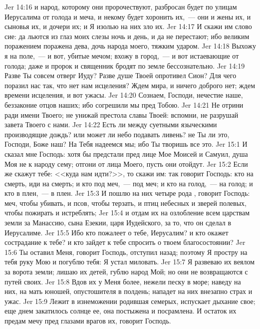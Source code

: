 \vs Jer 14:16 и народ, которому они пророчествуют, разбросан будет по улицам Иерусалима от голода и меча, и некому будет хоронить их,~--- они и жены их, и сыновья их, и дочери их; и Я изолью на них зло их.
\vs Jer 14:17 И скажи им слово сие: да льются из глаз моих слезы ночь и день, и да не перестают; ибо великим поражением поражена дева, дочь народа моего, тяжким ударом.
\vs Jer 14:18 Выхожу я на поле,~--- и вот, убитые мечом; вхожу в город,~--- и вот истаевающие от голода; даже и пророк и священник бродят по земле бессознательно.
\vs Jer 14:19 Разве Ты совсем отверг Иуду? Разве душе Твоей опротивел Сион? Для чего поразил нас так, что нет нам исцеления? Ждем мира, и ничего доброго нет; ждем времени исцеления, и вот ужасы.
\vs Jer 14:20 Сознаем, Господи, нечестие наше, беззаконие отцов наших; ибо согрешили мы пред Тобою.
\vs Jer 14:21 Не отрини  ради имени Твоего; не унижай престола славы Твоей: вспомни, не разрушай завета Твоего с нами.
\vs Jer 14:22 Есть ли между суетными  языческими производящие дождь? или может ли небо  подавать ливень? не Ты ли это, Господи, Боже наш? На Тебя надеемся мы; ибо Ты творишь все это.
\vs Jer 15:1 И сказал мне Господь: хотя бы предстали пред лице Мое Моисей и Самуил, душа Моя не  к народу сему; отгони  от лица Моего, пусть они отойдут.
\vs Jer 15:2 Если же скажут тебе: <<куда нам идти?>>, то скажи им: так говорит Господь: кто  на смерть, иди на смерть; и кто под меч,~--- под меч; и кто на голод,~--- на голод; и кто в плен,~--- в плен.
\vs Jer 15:3 И пошлю на них четыре рода , говорит Господь: меч, чтобы убивать, и псов, чтобы терзать, и птиц небесных и зверей полевых, чтобы пожирать и истреблять;
\vs Jer 15:4 и отдам их на озлобление всем царствам земли за Манассию, сына Езекии, царя Иудейского, за то, что он сделал в Иерусалиме.
\vs Jer 15:5 Ибо кто пожалеет о тебе, Иерусалим? и кто окажет сострадание к тебе? и кто зайдет к тебе спросить о твоем благосостоянии?
\vs Jer 15:6 Ты оставил Меня, говорит Господь, отступил назад; поэтому Я простру на тебя руку Мою и погублю тебя: Я устал миловать.
\vs Jer 15:7 Я развеваю их веялом за ворота земли; лишаю их детей, гублю народ Мой; но они не возвращаются с путей своих.
\vs Jer 15:8 Вдов их у Меня более, нежели песку в море; наведу на них, на мать юношей, опустошителя в полдень; нападет на них внезапно страх и ужас.
\vs Jer 15:9 Лежит в изнеможении родившая семерых, испускает дыхание свое; еще днем закатилось солнце ее, она постыжена и посрамлена. И остаток их предам мечу пред глазами врагов их, говорит Господь.
